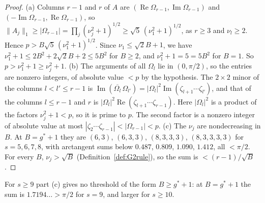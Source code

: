 \documentclass[11pt]{amsart}
\theoremstyle{definition}
\theoremstyle{plain}
\begin{document}
\begin{proof}
(a) Columns $r-1$ and $r$ of $A$ are $(\operatorname{Re}\Omega_{r-1},\operatorname{Im}\Omega_{r-1})$ and $(-\operatorname{Im}\Omega_{r-1},\operatorname{Re}\Omega_{r-1})$, so $\|A_j\|_1\ge|\Omega_{r-1}|=\prod_j(\nu_j^2+1)^{1/2}\ge\sqrt5\,(\nu_1^2+1)^{1/2}$, as $r\ge3$ and $\nu_l\ge2$. Hence $p>B\sqrt5\,(\nu_1^2+1)^{1/2}$. Since $\nu_1\le\sqrt2B+1$, we have $\nu_1^2+1\le2B^2+2\sqrt2B+2\le5B^2$ for $B\ge2$, and $\nu_1^2+1=5=5B^2$ for $B=1$. So $p>\nu_1^2+1\ge \nu_j^2+1$.
(b) The arguments of all $\Omega_l$ lie in $(0,\pi/2)$, so the entries are nonzero integers, of absolute value $<p$ by the hypothesis. The $2\times2$ minor of the columns $l<l'\le r-1$ is $\operatorname{Im}(\overline{\Omega_l}\,\Omega_{l'})=|\Omega_l|^2\operatorname{Im}(\zeta_{l+1}\cdots\zeta_{l'})$, and that of the columns $l\le r-1$ and $r$ is $|\Omega_l|^2\operatorname{Re}(\zeta_{l+1}\cdots\zeta_{r-1})$. Here $|\Omega_l|^2$ is a product of the factors $\nu_j^2+1<p$, so it is prime to $p$. The second factor is a nonzero integer of absolute value at most $|\zeta_2\cdots\zeta_{r-1}|<|\Omega_{r-1}|<p$.
(c) The $\nu_j$ are nondecreasing in $B$. At $B=g^*+1$ they are $(6,3)$, $(6,3,3)$, $(8,3,3,3)$, $(8,3,3,3,3)$ for $s=5,6,7,8$, with arctangent sums below $0.487$, $0.809$, $1.090$, $1.412$, all $<\pi/2$. For every $B$, $\nu_j>\sqrt B$ (Definition~\ref{def:G2rule}), so the sum is $<(r-1)/\sqrt B$.
\end{proof}

For $s\ge9$ part (c) gives no threshold of the form $B\ge g^*+1$: at $B=g^*+1$ the sum is $1.7194\ldots>\pi/2$ for $s=9$, and larger for $s\ge10$.
\end{document}

